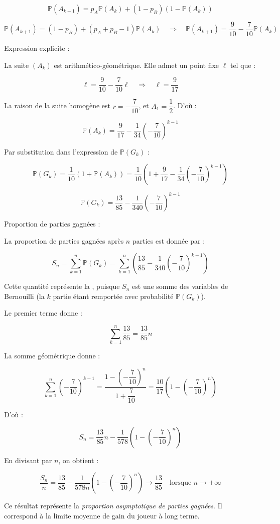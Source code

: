 \documentclass[10pt,a4paper]{article}
\begin{document}
\[
\mathbb{P}(A_{k+1}) = p_A \mathbb{P}(A_k) + (1 - p_B)(1 - \mathbb{P}(A_k))
\]

\[
\boxed{\mathbb{P}(A_{k+1}) = (1 - p_B) + (p_A + p_B - 1) \mathbb{P}(A_k)}
\quad \Rightarrow \quad
\boxed{\mathbb{P}(A_{k+1}) = \dfrac{9}{10} - \dfrac{7}{10} \mathbb{P}(A_k)}
\]


\q Expression explicite :

La suite \( (A_k) \) est arithmético-géométrique. Elle admet un point fixe \( \ell \) tel que :

\[
\ell = \dfrac{9}{10} - \dfrac{7}{10} \ell \quad \Rightarrow \quad \boxed{\ell = \dfrac{9}{17}}
\]

La raison de la suite homogène est \( r = -\dfrac{7}{10} \), et \( A_1 = \dfrac{1}{2} \). D'où :

\[
\boxed{\mathbb{P}(A_k) = \dfrac{9}{17} - \dfrac{1}{34} \left( -\dfrac{7}{10} \right)^{k - 1}}
\]

Par substitution dans l'expression de \( \mathbb{P}(G_k) \) :

\[
\mathbb{P}(G_k) = \dfrac{1}{10} \left( 1 + \mathbb{P}(A_k) \right)
= \dfrac{1}{10} \left( 1 + \dfrac{9}{17} - \dfrac{1}{34} \left( -\dfrac{7}{10} \right)^{k - 1} \right)
\]

\[
\boxed{\mathbb{P}(G_k) = \dfrac{13}{85} - \dfrac{1}{340} \left( -\dfrac{7}{10} \right)^{k - 1}}
\]


\q Proportion de parties gagnées :

La proportion de parties gagnées après \( n \) parties est donnée par :

\[
S_n = \sum_{k = 1}^{n} \mathbb{P}(G_k)
= \sum_{k = 1}^{n} \left( \dfrac{13}{85} - \dfrac{1}{340} \left( -\dfrac{7}{10} \right)^{k - 1} \right)
\]

Cette quantité représente la ,
puisque $S_n$ est une somme des variables de Bernouilli (la $k$ partie étant remportée avec
probabilité $\mathbb{P}(G_k)$).

Le premier terme donne :

\[
\sum_{k = 1}^{n} \dfrac{13}{85} = \dfrac{13}{85} n
\]

La somme géométrique donne :

\[
\sum_{k = 1}^{n} \left( -\dfrac{7}{10} \right)^{k - 1}
= \dfrac{1 - \left( -\dfrac{7}{10} \right)^n}{1 + \dfrac{7}{10}} = \dfrac{10}{17} \left( 1 - \left( -\dfrac{7}{10} \right)^n \right)
\]

D'où :

\[
\boxed{S_n = \dfrac{13}{85} n - \dfrac{1}{578} \left( 1 - \left( -\dfrac{7}{10} \right)^n \right)}
\]

\medskip

En divisant par \( n \), on obtient :

\[
\boxed{\dfrac{S_n}{n} = \dfrac{13}{85} - \dfrac{1}{578 n} \left( 1 - \left( -\dfrac{7}{10} \right)^n \right) \longrightarrow \dfrac{13}{85}}
\quad \text{lorsque } n \to +\infty
\]

Ce résultat représente la \emph{proportion asymptotique de parties gagnées}. Il correspond à la
limite moyenne de gain du joueur à long terme.
\end{document}
